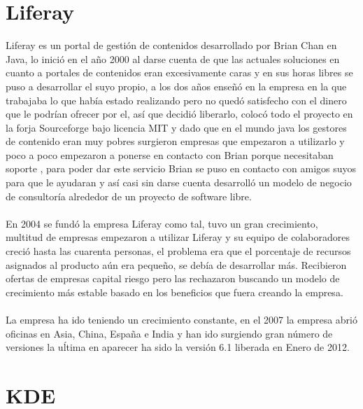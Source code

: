 \documentclass[a4paper,oneside,11pt]{article}
\begin{document}
\section{Liferay}

Liferay es un portal de gesti\'on de contenidos desarrollado por Brian Chan en Java, lo inici\'o en el año 2000 al darse cuenta de que 
las actuales soluciones en cuanto a portales de contenidos eran excesivamente caras y en sus horas libres se puso a desarrollar el
suyo propio, a los dos años enseñ\'o en la empresa en la que trabajaba lo que hab\'ia estado realizando pero no qued\'o satisfecho
con el dinero que le podr\'ian ofrecer por el, as\'i que decidi\'o liberarlo, coloc\'o todo el proyecto en la forja Sourceforge bajo 
licencia MIT y dado que en el mundo java los gestores de contenido eran muy pobres surgieron empresas que empezaron a utilizarlo y poco
a poco empezaron a ponerse en contacto con Brian porque necesitaban soporte , para poder dar este servicio Brian se puso en contacto
con amigos suyos para que le ayudaran y as\'i casi sin darse cuenta desarroll\'o un modelo de negocio de consultor\'ia alrededor de
un proyecto de software libre.
\\\\
En 2004 se fund\'o la empresa Liferay como tal, tuvo un gran crecimiento, multitud de empresas empezaron a utilizar Liferay y
su equipo de colaboradores creci\'o hasta las cuarenta personas, el problema era que el porcentaje de recursos asignados al
producto a\'un era pequeño, se deb\'ia de desarrollar m\'as. Recibieron ofertas de empresas capital riesgo pero las rechazaron buscando
un modelo de crecimiento m\'as estable basado en los beneficios que fuera creando la empresa.
\\\\
La empresa ha ido teniendo un crecimiento constante, en el 2007 la empresa abri\'o oficinas en Asia, China, España e India y han ido
surgiendo gran n\'umero de versiones la u\'ltima en aparecer ha sido la versi\'on 6.1 liberada en Enero de 2012.

\section{KDE}
\end{document}
